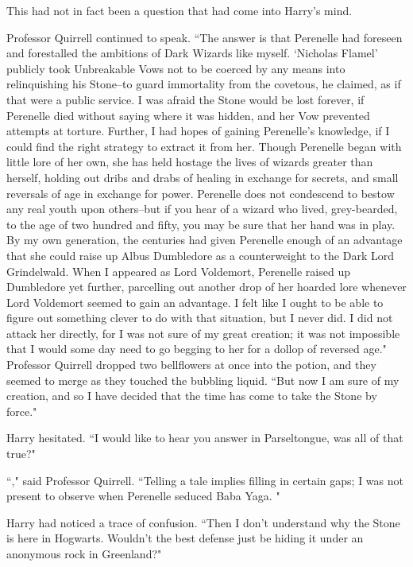 This had not in fact been a question that had come into Harry's mind.

Professor Quirrell continued to speak. ``The answer is that Perenelle had foreseen and forestalled the ambitions of Dark Wizards like myself. `Nicholas Flamel' publicly took Unbreakable Vows not to be coerced by any means into relinquishing his Stone\---to guard immortality from the covetous, he claimed, as if that were a public service. I was afraid the Stone would be lost forever, if Perenelle died without saying where it was hidden, and her Vow prevented attempts at torture. Further, I had hopes of gaining Perenelle's knowledge, if I could find the right strategy to extract it from her. Though Perenelle began with little lore of her own, she has held hostage the lives of wizards greater than herself, holding out dribs and drabs of healing in exchange for secrets, and small reversals of age in exchange for power. Perenelle does not condescend to bestow any real youth upon others\---but if you hear of a wizard who lived, grey-bearded, to the age of two hundred and fifty, you may be sure that her hand was in play. By my own generation, the centuries had given Perenelle enough of an advantage that she could raise up Albus Dumbledore as a counterweight to the Dark Lord Grindelwald. When I appeared as Lord Voldemort, Perenelle raised up Dumbledore yet further, parcelling out another drop of her hoarded lore whenever Lord Voldemort seemed to gain an advantage. I felt like I ought to be able to figure out something clever to do with that situation, but I never did. I did not attack her directly, for I was not sure of my great creation; it was not impossible that I would some day need to go begging to her for a dollop of reversed age." Professor Quirrell dropped two bellflowers at once into the potion, and they seemed to merge as they touched the bubbling liquid. ``But now I am sure of my creation, and so I have decided that the time has come to take the Stone by force."

Harry hesitated. ``I would like to hear you answer in Parseltongue, was all of that true?"

``," said Professor Quirrell. ``Telling a tale implies filling in certain gaps; I was not present to observe when Perenelle seduced Baba Yaga. "

Harry had noticed a trace of confusion. ``Then I don't understand why the Stone is here in Hogwarts. Wouldn't the best defense just be hiding it under an anonymous rock in Greenland?"

